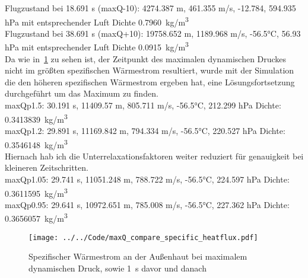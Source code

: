 Flugzustand bei 18.691 s (maxQ-10): 4274.387 m, 461.355 m/s, -12.784, 594.935 hPa mit entsprechender Luft Dichte \SI{0.7960}{kg/m^3}\\

Flugzustand bei 38.691 s (maxQ+10): 19758.652 m, 1189.968 m/s, -56.5°C, 56.93 hPa mit entsprechender Luft Dichte \SI{0.0915}{kg/m^3}\\

Da wie in~\ref{fig:spezifischer_waermestrom_maxQ_simulationen} zu sehen ist, der Zeitpunkt des maximalen dynamischen Druckes nicht im größten spezifischen
Wärmestrom resultiert, wurde mit der Simulation die den höheren spezifischen Wärmestrom ergeben hat, eine Lösungsfortsetzung durchgeführt um das Maximum zu finden.\\

maxQp1.5: 30.191 s, 11409.57 m, 805.711 m/s, -56.5°C, 212.299 hPa Dichte: \SI{0.3413839}{kg/m^3}\\
maxQp1.2: 29.891 s, 11169.842 m, 794.334 m/s, -56.5°C, 220.527 hPa Dichte: \SI{0.3546148}{kg/m^3}\\
Hiernach hab ich die Unterrelaxationsfaktoren weiter reduziert für genauigkeit bei kleineren Zeitschritten.\\
maxQp1.05: 29.741 s, 11051.248 m, 788.722 m/s, -56.5°C, 224.597 hPa Dichte: \SI{0.3611595}{kg/m^3}\\
maxQp0.95: 29.641 s, 10972.651 m, 785.008 m/s, -56.5°C, 227.362 hPa Dichte: \SI{0.3656057}{kg/m^3}\\
\begin{figure}[H]
  \centering
  \texttt{[image: ../../Code/maxQ\_compare\_specific\_heatflux.pdf]}
  \caption{Spezifischer Wärmestrom an der Außenhaut bei maximalem dynamischen Druck, sowie \SI{1}{s} davor und danach}\label{fig:spezifischer_waermestrom_maxQ_simulationen}
\end{figure}